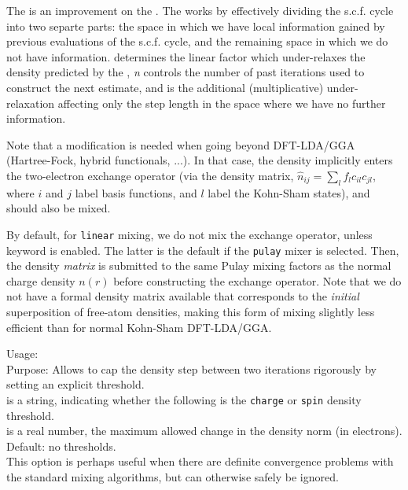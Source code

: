 The   is an improvement on the  . The   works by effectively dividing the s.c.f. cycle into two separte parts: the space in which we have local information gained by previous evaluations of the s.c.f. cycle, and the remaining space in which we do not have information.  determines the linear factor which under-relaxes the density predicted by the  ,  \emph{n} controls the number of past iterations used to construct the next estimate, and  is the additional (multiplicative) under-relaxation affecting only the step length in the space where we have no further information.

Note that a modification is needed when going beyond DFT-LDA/GGA
(Hartree-Fock, hybrid functionals, ...). In
that case, the density implicitly enters the two-electron exchange
operator (via the density matrix,
$\hat{n}_{ij}=\sum_l f_l c_{il} c_{jl}$, where
$i$ and $j$ label basis functions, and $l$ label the Kohn-Sham
states), and should also be mixed.

By default, for \texttt{linear}
mixing, we do not mix the exchange operator, unless keyword
 is enabled. The latter is the
default if the \texttt{pulay} mixer is selected. Then, the
density \emph{matrix} is submitted to the same Pulay mixing factors as
the normal charge density $n(r)$ before constructing the exchange
operator. Note that we do not have a formal density matrix
available that corresponds to the \emph{initial} superposition of
free-atom densities, making this form of mixing slightly less
efficient than for normal Kohn-Sham DFT-LDA/GGA.

{
  \noindent
  Usage:  
     \\[1.0ex]
  Purpose: Allows to cap the density step between two iterations
    rigorously by setting an explicit threshold. \\[1.0ex]
   is a string, indicating whether the following is
    the \texttt{charge} or \texttt{spin} density threshold. \\
   is a real number, the maximum allowed change in
    the density norm (in electrons). Default: no thresholds. \\
}
This option is perhaps useful when there are definite convergence
problems with the standard mixing algorithms, but can otherwise safely
be ignored.

